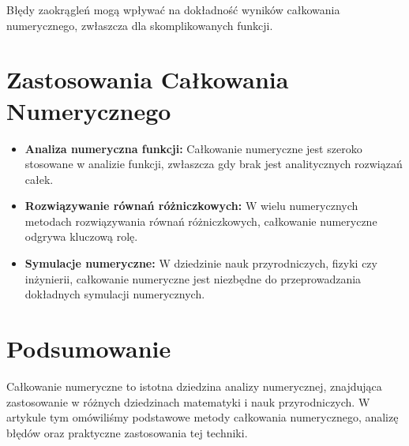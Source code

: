 \documentclass[12pt]{article}
\begin{document}
\begin{theorem}
Błędy zaokrągleń mogą wpływać na dokładność wyników całkowania numerycznego, zwłaszcza dla skomplikowanych funkcji.
\end{theorem}

\section{Zastosowania Całkowania Numerycznego}
\begin{itemize}
  \item \textbf{Analiza numeryczna funkcji:} Całkowanie numeryczne jest szeroko stosowane w analizie funkcji, zwłaszcza gdy brak jest analitycznych rozwiązań całek.
  
  \item \textbf{Rozwiązywanie równań różniczkowych:} W wielu numerycznych metodach rozwiązywania równań różniczkowych, całkowanie numeryczne odgrywa kluczową rolę.
  
  \item \textbf{Symulacje numeryczne:} W dziedzinie nauk przyrodniczych, fizyki czy inżynierii, całkowanie numeryczne jest niezbędne do przeprowadzania dokładnych symulacji numerycznych.
\end{itemize}

\section{Podsumowanie}
Całkowanie numeryczne to istotna dziedzina analizy numerycznej, znajdująca zastosowanie w różnych dziedzinach matematyki i nauk przyrodniczych. W artykule tym omówiliśmy podstawowe metody całkowania numerycznego, analizę błędów oraz praktyczne zastosowania tej techniki.
\end{document}
